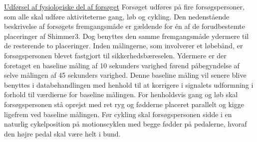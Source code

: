 \underline{Udførsel af fysiologiske del af forsøget}\newline
Forsøget udføres på fire forsøgspersoner, som alle skal udføre aktiviteterne gang, løb og cykling. Den nedenstående beskrivelse af forsøgets fremgangsmåde er gældende for én af de forudbestemte placeringer af Shimmer3. Dog benyttes den samme fremgangsmåde ydermere til de resterende to placeringer. \newline
 Inden målingerne, som involverer et løbebånd, er forsøgspersonen blevet fastgjort til sikkerhedsbæreselen. Ydermere er der foretaget en baseline måling af 10 sekunders varighed førend påbegyndelse af selve målingen af 45 sekunders varighed. Denne baseline måling vil senere blive benyttes i databehandlingen med henhold til at korrigere i signalets udformning i forhold til værdierne for baseline målingen. \newline
For henholdsvis gang og løb skal forsøgspersonen stå oprejst med ret ryg og fødderne placeret parallelt og kigge ligefrem ved baseline målingen. Før cykling skal forsøgspersonen sidde i en naturlig cykelposition på motionscyklen med begge fødder på pedalerne, hvoraf den højre pedal skal være helt i bund. \newline

